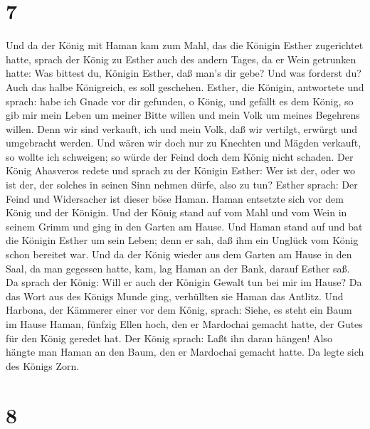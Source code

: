 \hypertarget{section-6}{%
\section{7}\label{section-6}}

 Und da der König mit Haman kam zum Mahl, das die Königin
Esther zugerichtet hatte,  sprach der König zu Esther auch
des andern Tages, da er Wein getrunken hatte: Was bittest du, Königin
Esther, daß man's dir gebe? Und was forderst du? Auch das halbe
Königreich, es soll geschehen.  Esther, die Königin,
antwortete und sprach: habe ich Gnade vor dir gefunden, o König, und
gefällt es dem König, so gib mir mein Leben um meiner Bitte willen und
mein Volk um meines Begehrens willen.  Denn wir sind
verkauft, ich und mein Volk, daß wir vertilgt, erwürgt und umgebracht
werden. Und wären wir doch nur zu Knechten und Mägden verkauft, so
wollte ich schweigen; so würde der Feind doch dem König nicht schaden.
 Der König Ahasveros redete und sprach zu der Königin
Esther: Wer ist der, oder wo ist der, der solches in seinen Sinn nehmen
dürfe, also zu tun?  Esther sprach: Der Feind und
Widersacher ist dieser böse Haman. Haman entsetzte sich vor dem König
und der Königin.  Und der König stand auf vom Mahl und vom
Wein in seinem Grimm und ging in den Garten am Hause. Und Haman stand
auf und bat die Königin Esther um sein Leben; denn er sah, daß ihm ein
Unglück vom König schon bereitet war.  Und da der König
wieder aus dem Garten am Hause in den Saal, da man gegessen hatte, kam,
lag Haman an der Bank, darauf Esther saß. Da sprach der König: Will er
auch der Königin Gewalt tun bei mir im Hause? Da das Wort aus des Königs
Munde ging, verhüllten sie Haman das Antlitz.  Und Harbona,
der Kämmerer einer vor dem König, sprach: Siehe, es steht ein Baum im
Hause Haman, fünfzig Ellen hoch, den er Mardochai gemacht hatte, der
Gutes für den König geredet hat. Der König sprach: Laßt ihn daran
hängen!  Also hängte man Haman an den Baum, den er
Mardochai gemacht hatte. Da legte sich des Königs Zorn.

\hypertarget{section-7}{%
\section{8}\label{section-7}}

